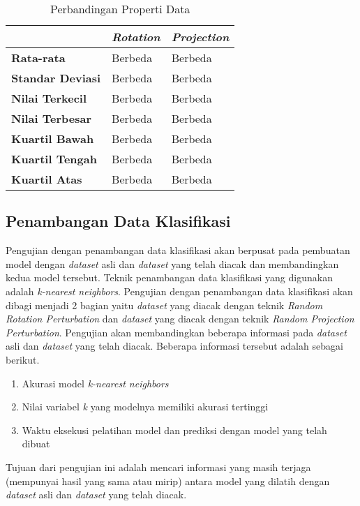 \begin{table}
	\centering
	\caption{Perbandingan Properti Data}
	\begin{tabular}{|l|l|l|}
		\hline
		&\textbf{\textit{Rotation}}&\textbf{\textit{Projection}}\\ \hline
		\textbf{Rata-rata}&Berbeda&Berbeda\\
		\textbf{Standar Deviasi}&Berbeda&Berbeda\\
		\textbf{Nilai Terkecil}&Berbeda&Berbeda\\
		\textbf{Nilai Terbesar}&Berbeda&Berbeda\\
		\textbf{Kuartil Bawah}&Berbeda&Berbeda\\
		\textbf{Kuartil Tengah}&Berbeda&Berbeda\\
		\textbf{Kuartil Atas}&Berbeda&Berbeda\\
		\hline
	\end{tabular}
	\label{table:perbandingan-properti}
\end{table}

\subsection{Penambangan Data Klasifikasi}
\label{subsec:pengujian-klasifikasi}
Pengujian dengan penambangan data klasifikasi akan berpusat pada pembuatan model dengan \textit{dataset} asli dan \textit{dataset} yang telah diacak dan membandingkan kedua model tersebut. Teknik penambangan data klasifikasi yang digunakan adalah \textit{k-nearest neighbors}. Pengujian dengan penambangan data klasifikasi akan dibagi menjadi 2 bagian yaitu \textit{dataset} yang diacak dengan teknik \textit{Random Rotation Perturbation} dan \textit{dataset} yang diacak dengan teknik \textit{Random Projection Perturbation}. Pengujian akan membandingkan beberapa informasi pada \textit{dataset} asli dan \textit{dataset} yang telah diacak. Beberapa informasi tersebut adalah sebagai berikut.
\begin{enumerate}
	\item Akurasi model \textit{k-nearest neighbors}
	\item Nilai variabel \textit{k} yang modelnya memiliki akurasi tertinggi
	\item Waktu eksekusi pelatihan model dan prediksi dengan model yang telah dibuat
\end{enumerate}
Tujuan dari pengujian ini adalah mencari informasi yang masih terjaga (mempunyai hasil yang sama atau mirip) antara model yang dilatih dengan \textit{dataset} asli dan \textit{dataset} yang telah diacak.

